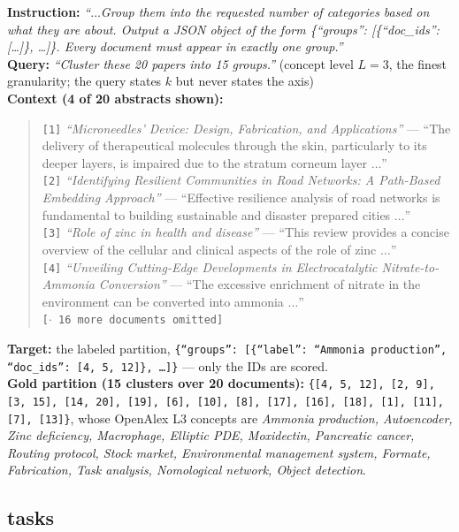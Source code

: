 \textbf{Instruction:} \emph{``$\dots$Group them into the requested number of categories based on what
they are about. Output a JSON object of the form \{``groups'': [\{``doc\_ids'': [\dots]\}, \dots]\}.
Every document must appear in exactly one group.''}\\
\textbf{Query:} \emph{``Cluster these 20 papers into 15 groups.''} (concept level $L{=}3$, the finest
granularity; the query states $k$ but never states the axis)\\
\textbf{Context (4 of 20 abstracts shown):}
\begin{quote}\small
\texttt{[1]} \emph{``Microneedles' Device: Design, Fabrication, and Applications''} --- ``The
delivery of therapeutical molecules through the skin, particularly to its deeper layers, is impaired
due to the stratum corneum layer $\dots$''\\
\texttt{[2]} \emph{``Identifying Resilient Communities in Road Networks: A Path-Based Embedding
Approach''} --- ``Effective resilience analysis of road networks is fundamental to building
sustainable and disaster prepared cities $\dots$''\\
\texttt{[3]} \emph{``Role of zinc in health and disease''} --- ``This review provides a concise
overview of the cellular and clinical aspects of the role of zinc $\dots$''\\
\texttt{[4]} \emph{``Unveiling Cutting-Edge Developments in Electrocatalytic Nitrate-to-Ammonia
Conversion''} --- ``The excessive enrichment of nitrate in the environment can be converted into
ammonia $\dots$''\\
\texttt{[$\cdot$ 16 more documents omitted]}
\end{quote}
\textbf{Target:} the labeled partition, \texttt{\{``groups'': [\{``label'': ``Ammonia
production'', ``doc\_ids'': [4, 5, 12]\}, \dots]\}} --- only the IDs are scored.\\
\textbf{Gold partition (15 clusters over 20 documents):} \texttt{\{[4, 5, 12], [2, 9], [3, 15],
[14, 20], [19], [6], [10], [8], [17], [16], [18], [1], [11], [7], [13]\}}, whose OpenAlex L3 concepts
are \emph{Ammonia production, Autoencoder, Zinc deficiency, Macrophage, Elliptic PDE, Moxidectin,
Pancreatic cancer, Routing protocol, Stock market, Environmental management system, Formate,
Fabrication, Task analysis, Nomological network, Object detection}.


\subsection{\texorpdfstring{}{OT(N2)} tasks}

